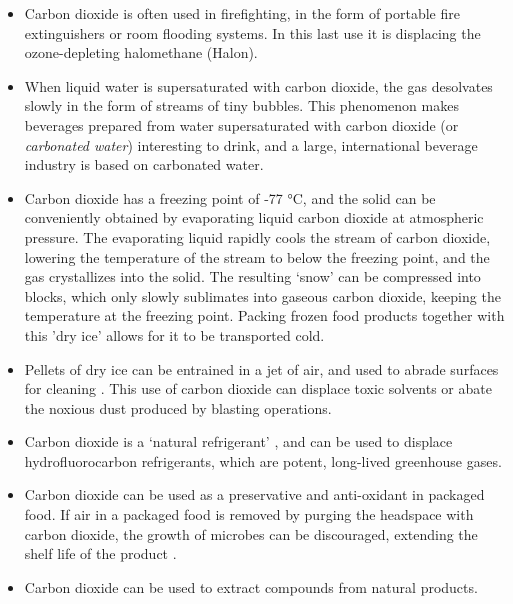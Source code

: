 \begin{itemize}
  
  \item Carbon dioxide is often used in firefighting, in the form of portable
  fire extinguishers or room flooding systems. In this last use it is
  displacing the ozone-depleting halomethane (Halon).
  
  \item When liquid water is supersaturated with carbon dioxide, the gas
  desolvates slowly in the form of streams of tiny bubbles. This phenomenon
  makes beverages prepared from water supersaturated with carbon dioxide (or
  \textit{carbonated water}) interesting to drink, and a large, international
  beverage industry is based on carbonated water.
   
   \item Carbon dioxide has a freezing point of {-}77 °C, and the solid can be
   conveniently obtained by evaporating liquid carbon dioxide at atmospheric
   pressure. The evaporating liquid rapidly cools the stream of carbon dioxide,
   lowering the temperature of the stream to below the freezing point, and the
   gas crystallizes into the solid. The resulting `snow' can be compressed into
   blocks, which only slowly sublimates into gaseous carbon dioxide, keeping the
   temperature at the freezing point. Packing frozen food products together with
   this 'dry ice' allows for it to be transported cold.
   
   \item Pellets of dry ice can be entrained in a jet of air, and used to abrade
   surfaces for cleaning \autocite{Spur1999}. This use of carbon dioxide can
   displace toxic solvents or abate the noxious dust produced by blasting operations.
   
   \item Carbon dioxide is a `natural refrigerant' \autocite{Pearson2005}, and
   can be used to displace hydrofluorocarbon refrigerants, which are potent,
   long-lived greenhouse gases.
   
   \item Carbon dioxide can be used as a preservative and anti-oxidant in
   packaged food. If air in a packaged food is removed by purging the headspace
   with carbon dioxide, the growth of microbes can be discouraged, extending the
   shelf life of the product \autocite{Jacobsen2002}.
	   
	\item Carbon dioxide can be used to extract compounds from natural products. 
	
\end{itemize}

